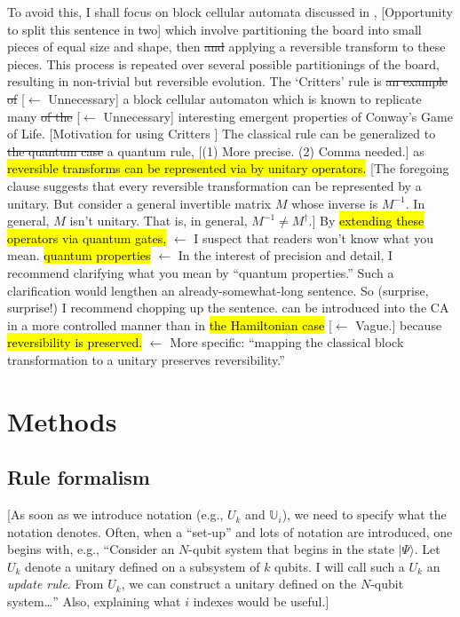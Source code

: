 \documentclass[11pt]{article}
\newcommand{\nicole}[1]{{\color{Green}#1}}
\begin{document}
\begin{multicols}{2}
To avoid this\nicole{,} I shall focus on block cellular automata discussed in \cite{Margolus}, 
\nicole{[Opportunity to split this sentence in two]}
which involve partitioning the board into small pieces of equal size and shape\nicole{, then} \sout{and} applying a reversible transform to these pieces. This process is repeated over several possible partitionings of the board, resulting in non-trivial but reversible evolution. The `Critters' rule is \sout{an example of}  \nicole{[$\leftarrow$ Unnecessary]} a block cellular automaton which is known to replicate many \sout{of the} \nicole{[$\leftarrow$ Unnecessary]} interesting emergent properties of Conway's Game of Life.  \nicole{[Motivation for using Critters \checkmark]}
The classical rule can be generalized to 
\sout{the quantum case} \nicole{a quantum rule, [(1) More precise. (2) Comma needed.]}
as \hl{reversible transforms can be represented via by unitary operators.} 
\nicole{[The foregoing clause suggests that every reversible transformation can be represented by a unitary. But consider a general invertible matrix $M$ whose inverse is $M^{-1}$. In general, $M$ isn't unitary. That is, in general, $M^{-1} \neq M^\dag$.]}
By \hl{extending these operators via quantum gates,}
\nicole{$\leftarrow$ I suspect that readers won't know what you mean.} 
\hl{quantum properties}
\nicole{$\leftarrow$ In the interest of precision and detail, I recommend clarifying what you mean by ``quantum properties.'' Such a clarification would lengthen an already-somewhat-long sentence. So (surprise, surprise!) I recommend chopping up the sentence.}
can be introduced into the CA in a more controlled manner than 
in \hl{the Hamiltonian case} \nicole{[$\leftarrow$ Vague.]} because \hl{reversibility is preserved.} \nicole{$\leftarrow$ More specific: ``mapping the classical block transformation  to a unitary preserves reversibility.''}


\section*{Methods}

\subsection*{Rule formalism}

\nicole{[As soon as we introduce notation (e.g., $U_k$ and $\mathbb{U}_{i}$), we need to specify what the notation denotes. Often, when a ``set-up'' and lots of notation are introduced, one begins with, e.g., ``Consider an $N$-qubit system that begins in the state $| \Psi \rangle$. Let $U_k$ denote a unitary defined on a subsystem of $k$ qubits. I will call such a $U_k$ an \emph{update rule}.
From $U_k$, we can construct a unitary defined on the $N$-qubit system\ldots''
Also, explaining what $i$ indexes would be useful.]}


\end{multicols}
\end{document}
